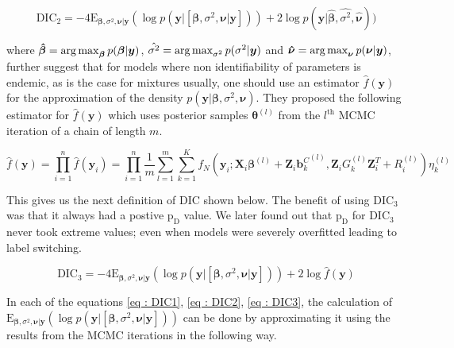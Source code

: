 \begin{equation}
\label{eq : DIC2}
\text{DIC}_2 = -4\text{E}_{\boldsymbol{\beta}, \sigma^2, \boldsymbol{\nu}|\boldsymbol{y}}(\log{p(\boldsymbol{y}|[\boldsymbol{\beta}, \sigma^2, \boldsymbol{\nu}|\boldsymbol{y}])}) + 2\log{p(\boldsymbol{y}|\boldsymbol{\hat{\beta}}, \hat{\sigma^2}, \boldsymbol{\hat{\nu}})})
\end{equation}

where
$\boldsymbol{\hat{\beta}} = \operatorname*{arg\,max}_{\boldsymbol{\beta}}p(\boldsymbol{\beta}|\boldsymbol{y})$,
$\hat{\sigma^2} = \operatorname*{arg\,max}_{\sigma^2}p(\sigma^2|\boldsymbol{y})$ and
$\boldsymbol{\hat{\nu}} = \operatorname*{arg\,max}_{\boldsymbol{\nu}}p(\boldsymbol{\nu}|\boldsymbol{y})$,\\

\citet{celeux_deviance_2006} further suggest that for models where non identifiability of parameters is endemic, as is the case for mixtures usually, one should use an estimator $\hat{f}(\boldsymbol{y})$ for the approximation of the density $p(\boldsymbol{y} | \boldsymbol{\beta}, \sigma^2, \boldsymbol{\nu})$. They proposed the following estimator for $\hat{f}(\boldsymbol{y})$ which uses posterior samples $\boldsymbol{\theta}^{(l)}$ from the $l^{\text{th}}$ MCMC iteration of a chain of length $m$.

$$\hat{f}(\boldsymbol{y}) = \prod_{i=1}^n \hat{f}(\boldsymbol{y}_i) = \prod_{i=1}^n \frac 1 m \sum_{l=1}^m \sum_{k=1}^K f_N(\boldsymbol{y}_i; \boldsymbol{X}_i\boldsymbol{\beta}^{(l)} + \boldsymbol{Z}_i {\boldsymbol{b}_k^C}^{(l)}, \boldsymbol{Z}_{i} G_k^{(l)} \boldsymbol{Z}_{i}^T+ R_i^{(l)}) \eta_k^{(l)}$$

This gives us the next definition of DIC shown below. The benefit of using $\text{DIC}_3$ was that it always had a postive $\text{p}_\text{D}$ value. We later found out that $\text{p}_\text{D}$ for $\text{DIC}_3$ never took extreme values; even when models were severely overfitted leading to label switching.

\begin{equation}
\label{eq : DIC3}
\text{DIC}_3 = -4\text{E}_{\boldsymbol{\beta}, \sigma^2, \boldsymbol{\nu}|\boldsymbol{y}}(\log{p(\boldsymbol{y}|[\boldsymbol{\beta}, \sigma^2, \boldsymbol{\nu}|\boldsymbol{y}])}) + 2\log{\hat{f}(\boldsymbol{y})}
\end{equation}

In each of the equations \ref{eq : DIC1}, \ref{eq : DIC2}, \ref{eq : DIC3}, the calculation of $\text{E}_{\boldsymbol{\beta}, \sigma^2, \boldsymbol{\nu}|\boldsymbol{y}}(\log{p(\boldsymbol{y}|[\boldsymbol{\beta}, \sigma^2, \boldsymbol{\nu}|\boldsymbol{y}])}) $ can be done by approximating it using the results from the MCMC iterations in the following way.

